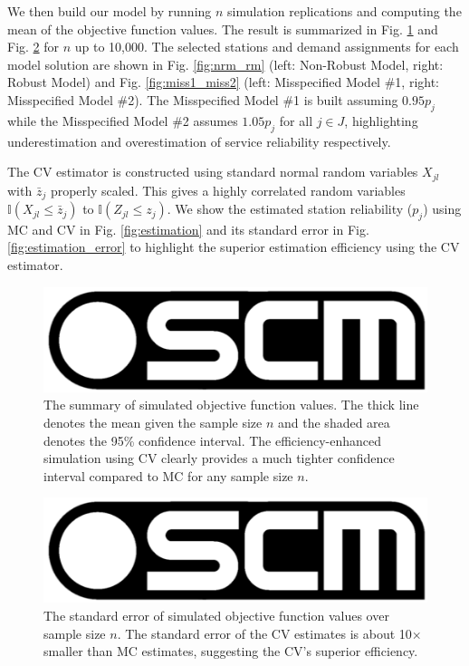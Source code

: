 \documentclass[preprint]{oscmjournal}
\theoremstyle{remark}
\begin{document}
\begin{table}
\begin{threeparttable}
\begin{tabular}{@{} c l c S[table-format=5.0] c @{}}
\bottomrule
\end{tabular}

\label{tab:model_params}
\end{threeparttable}
\end{table} 



We then build our model by running $n$ simulation replications and computing the mean of the objective function values. The result is summarized in Fig. \ref{fig:cv_est} and Fig. \ref{fig:cv_std} for $n$ up 
 to 10,000. The selected stations and demand assignments for each model solution are shown in Fig. \ref{fig:nrm_rm} (left: Non-Robust Model, right: Robust Model) and Fig. \ref{fig:miss1_miss2} (left: Misspecified Model \#1, right: Misspecified Model \#2). The Misspecified Model \#1 is built assuming $0.95p_j$ while the Misspecified Model \#2 assumes $1.05p_j$ for all $j \in J$, highlighting underestimation and overestimation of service reliability respectively. 
 
 The CV estimator is constructed using standard normal random variables $X_{jl}$ with $\bar z_j$ properly scaled. This gives a highly correlated random variables $\mathbb I(X_{jl} \leq \bar z_j)$ to $\mathbb I(Z_{jl} \leq z_j)$. We show the estimated station reliability ($p_j$) using MC and CV in Fig. \ref{fig:estimation} and its standard error in Fig. \ref{fig:estimation_error} to highlight the superior estimation efficiency using the CV estimator. 

\begin{figure}
    \centering
    \includegraphics[width=0.25\linewidth]{figs/oscm.png}    
    \caption{The summary of simulated objective function values. The thick line denotes the mean given the sample size $n$ and the shaded area denotes the 95\% confidence interval.  The efficiency-enhanced simulation using CV clearly provides a much tighter confidence interval compared to MC for any sample size $n$.
    }
    \label{fig:cv_est}
\end{figure}

\begin{figure}
    \centering
    \includegraphics[width=0.25\linewidth]{figs/oscm.png}
    \caption{The standard error of simulated objective function values over sample size $n$. The standard error of the CV estimates is about 10$\times$ smaller than MC estimates, suggesting the CV's superior efficiency.
    }
    \label{fig:cv_std}
\end{figure}
\end{document}
